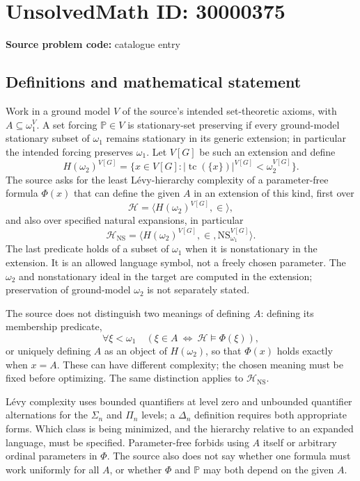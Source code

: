 \documentclass[11pt]{article}
\begin{document}
\section*{UnsolvedMath ID: 30000375}
\textbf{Source problem code:} catalogue entry
\subsection{Definitions and mathematical statement}
Work in a ground model \(V\) of the source's intended set-theoretic axioms, with \(A\subseteq\omega_1^V\). A set forcing \(\mathbb P\in V\) is stationary-set preserving if every ground-model stationary subset of \(\omega_1\) remains stationary in its generic extension; in particular the intended forcing preserves \(\omega_1\). Let \(V[G]\) be such an extension and define
\[
H(\omega_2)^{V[G]}=\{x\in V[G]:|\operatorname{tc}(\{x\})|^{V[G]}<\omega_2^{V[G]}\}.
\]
The source asks for the least L\'evy-hierarchy complexity of a parameter-free formula \(\Phi(x)\) that can define the given \(A\) in an extension of this kind, first over
\[
\mathcal H=\langle H(\omega_2)^{V[G]},\in\rangle,
\]
and also over specified natural expansions, in particular
\[
\mathcal H_{\mathrm{NS}}=\langle H(\omega_2)^{V[G]},\in,\mathrm{NS}_{\omega_1}^{V[G]}\rangle.
\]
The last predicate holds of a subset of \(\omega_1\) when it is nonstationary in the extension. It is an allowed language symbol, not a freely chosen parameter. The \(\omega_2\) and nonstationary ideal in the target are computed in the extension; preservation of ground-model \(\omega_2\) is not separately stated.

The source does not distinguish two meanings of defining \(A\): defining its membership predicate,
\[
\forall\xi<\omega_1\quad(\xi\in A\ \Longleftrightarrow\ \mathcal H\models\Phi(\xi)),
\]
or uniquely defining \(A\) as an object of \(H(\omega_2)\), so that \(\Phi(x)\) holds exactly when \(x=A\). These can have different complexity; the chosen meaning must be fixed before optimizing. The same distinction applies to \(\mathcal H_{\mathrm{NS}}\).

L\'evy complexity uses bounded quantifiers at level zero and unbounded quantifier alternations for the \(\Sigma_n\) and \(\Pi_n\) levels; a \(\Delta_n\) definition requires both appropriate forms. Which class is being minimized, and the hierarchy relative to an expanded language, must be specified. Parameter-free forbids using \(A\) itself or arbitrary ordinal parameters in \(\Phi\). The source also does not say whether one formula must work uniformly for all \(A\), or whether \(\Phi\) and \(\mathbb P\) may both depend on the given \(A\).
\end{document}
